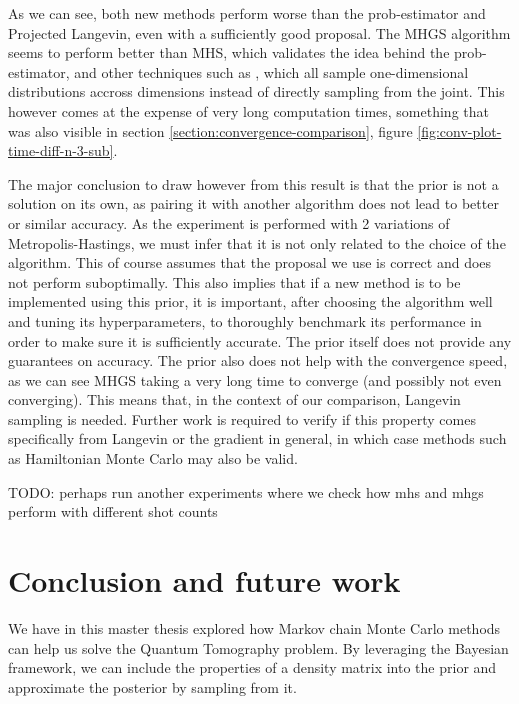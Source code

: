 \documentclass[12pt]{memoir}
\begin{document}
As we can see, both new methods perform worse than the prob-estimator and Projected Langevin, even with a sufficiently good proposal. The MHGS algorithm seems to perform better than MHS, which validates the idea behind the prob-estimator, and other techniques such as \cite{Mai22, LLJL20}, which all sample one-dimensional distributions accross dimensions instead of directly sampling from the joint. This however comes at the expense of very long computation times, something that was also visible in section \ref{section:convergence-comparison}, figure \ref{fig:conv-plot-time-diff-n-3-sub}.\medbreak

The major conclusion to draw however from this result is that the prior is not a solution on its own, as pairing it with another algorithm does not lead to better or similar accuracy. As the experiment is performed with 2 variations of Metropolis-Hastings, we must infer that it is not only related to the choice of the algorithm. This of course assumes that the proposal we use is correct and does not perform suboptimally. This also implies that if a new method is to be implemented using this prior, it is important, after choosing the algorithm well and tuning its hyperparameters, to thoroughly benchmark its performance in order to make sure it is sufficiently accurate. The prior itself does not provide any guarantees on accuracy. The prior also does not help with the convergence speed, as we can see MHGS taking a very long time to converge (and possibly not even converging). This means that, in the context of our comparison, Langevin sampling is needed. Further work is required to verify if this property comes specifically from Langevin or the gradient in general, in which case methods such as Hamiltonian Monte Carlo may also be valid.

TODO: perhaps run another experiments where we check how mhs and mhgs perform with different shot counts 
\chapter{Conclusion and future work}
We have in this master thesis explored how Markov chain Monte Carlo methods can help us solve the Quantum Tomography problem. By leveraging the Bayesian framework, we can include the properties of a density matrix into the prior and approximate the posterior by sampling from it.\medbreak
\end{document}

